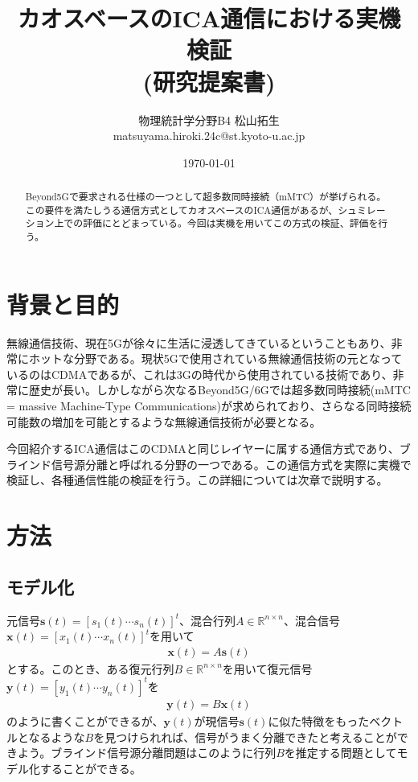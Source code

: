 \documentclass{jsarticle}
\title{カオスベースのICA通信における実機検証 \\ \large (研究提案書)}
\author{物理統計学分野B4 松山拓生 \\ matsuyama.hiroki.24c@st.kyoto-u.ac.jp}
\date{\today}
\begin{document}
\maketitle

\begin{abstract}
Beyond5Gで要求される仕様の一つとして超多数同時接続（mMTC）が挙げられる。この要件を満たしうる通信方式としてカオスベースのICA通信があるが、シュミレーション上での評価にとどまっている。今回は実機を用いてこの方式の検証、評価を行う。
\end{abstract} 

\section{背景と目的}
無線通信技術、現在5Gが徐々に生活に浸透してきているということもあり、非常にホットな分野である。現状5Gで使用されている無線通信技術の元となっているのはCDMA\cite{cdma-overview}であるが、これは3Gの時代から使用されている技術であり、非常に歴史が長い。しかしながら次なるBeyond5G/6Gでは超多数同時接続\cite{mmtc}(mMTC = massive Machine-Type Communications)が求められており、さらなる同時接続可能数の増加を可能とするような無線通信技術が必要となる。

今回紹介するICA通信\cite{red-book}はこのCDMAと同じレイヤーに属する通信方式であり、ブラインド信号源分離と呼ばれる分野の一つである。この通信方式を実際に実機で検証し、各種通信性能の検証を行う。この詳細については次章で説明する。

\section{方法}
\subsection{モデル化}
元信号$\textbf{s}(t) = [s_1(t) \cdots s_n(t)]^t$、混合行列$A\in \mathbb{R}^{n\times n}$、混合信号$\textbf{x}(t) = [x_1(t) \cdots x_n(t)]^t$を用いて
\begin{gather}
    \textbf{x}(t) = A\textbf{s}(t)
\end{gather}
とする。このとき、ある復元行列$B\in \mathbb{R}^{n\times n}$を用いて復元信号$\textbf{y}(t)= [y_1(t) \cdots y_n(t)]^t$を
\begin{gather}
    \textbf{y}(t) = B\textbf{x}(t)
\end{gather}
のように書くことができるが、$\textbf{y}(t)$が現信号$\textbf{s}(t)$に似た特徴をもったベクトルとなるような$B$を見つけられれば、信号がうまく分離できたと考えることができよう。ブラインド信号源分離問題はこのように行列$B$を推定する問題としてモデル化することができる。
\end{document}
